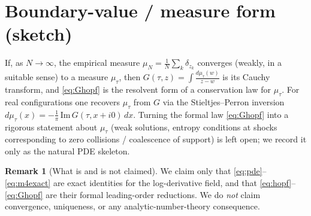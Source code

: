 \documentclass[11pt]{article}
\theoremstyle{plain}
\theoremstyle{definition}
\newtheorem{remark}{Remark}
\begin{document}
\section{Boundary-value / measure form (sketch)}

If, as $N\to\infty$, the empirical measure
$\mu_N=\frac1N\sum_k\delta_{z_k}$ converges (weakly, in a suitable sense) to a
measure $\mu_\tau$, then $G(\tau,z)=\int\frac{d\mu_\tau(w)}{z-w}$ is its Cauchy
transform, and \eqref{eq:Ghopf} is the resolvent form of a conservation law for
$\mu_\tau$. For real configurations one recovers $\mu_\tau$ from $G$ via the
Stieltjes--Perron inversion
$d\mu_\tau(x)=-\frac1\pi\,\mathrm{Im}\,G(\tau,x+i0)\,dx$. Turning the formal law
\eqref{eq:Ghopf} into a rigorous statement about $\mu_\tau$ (weak solutions,
entropy conditions at shocks corresponding to zero collisions / coalescence of
support) is left open; we record it only as the natural PDE skeleton.

\begin{remark}[What is and is not claimed]
We claim only that \eqref{eq:pde}--\eqref{eq:m4exact} are exact identities for
the log-derivative field, and that \eqref{eq:hopf}--\eqref{eq:Ghopf} are their
formal leading-order reductions. We do \emph{not} claim convergence, uniqueness,
or any analytic-number-theory consequence.
\end{remark}
\end{document}
